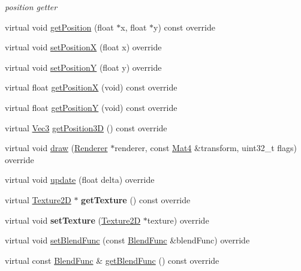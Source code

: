 \begin{DoxyCompactItemize}
\begin{DoxyCompactList}\small\item\em position getter \end{DoxyCompactList}\item 
virtual void \hyperlink{classMotionStreak_a376d2fd83190f87fa86f1aa91ac8f158}{get\+Position} (float $\ast$x, float $\ast$y) const override
\item 
virtual void \hyperlink{classMotionStreak_af6cb7fe8388e16af000893b75c9676a0}{set\+PositionX} (float x) override
\item 
virtual void \hyperlink{classMotionStreak_a75b545604e6a5f2351f6d4b034edb185}{set\+PositionY} (float y) override
\item 
virtual float \hyperlink{classMotionStreak_a21adf0bcf7c0713e1e0b0b00c5256a37}{get\+PositionX} (void) const override
\item 
virtual float \hyperlink{classMotionStreak_a05d60b5b380417f870046d8aa5f6626b}{get\+PositionY} (void) const override
\item 
virtual \hyperlink{classVec3}{Vec3} \hyperlink{classMotionStreak_ab07adb87a9770b5bbafa2fff999515f6}{get\+Position3D} () const override
\item 
virtual void \hyperlink{classMotionStreak_a5cde4c7320bde796324d67ac11125a1f}{draw} (\hyperlink{classRenderer}{Renderer} $\ast$renderer, const \hyperlink{classMat4}{Mat4} \&transform, uint32\+\_\+t flags) override
\item 
virtual void \hyperlink{classMotionStreak_a03d1e1113084f8e91b537539e7c19b9c}{update} (float delta) override
\item 
\mbox{\label{classMotionStreak_a0efaeb00232506d2181cc57409b14fb7}} 
virtual \hyperlink{classTexture2D}{Texture2D} $\ast$ {\bfseries get\+Texture} () const override
\item 
\mbox{\label{classMotionStreak_af8bb96c68d2d0ce89f9d7d711d6852a7}} 
virtual void {\bfseries set\+Texture} (\hyperlink{classTexture2D}{Texture2D} $\ast$texture) override
\item 
virtual void \hyperlink{classMotionStreak_adccc64d7aba6a8ffc6ce34a0813630af}{set\+Blend\+Func} (const \hyperlink{structBlendFunc}{Blend\+Func} \&blend\+Func) override
\item 
virtual const \hyperlink{structBlendFunc}{Blend\+Func} \& \hyperlink{classMotionStreak_a3a0c0b09fffc1d33efaf197f22e6e590}{get\+Blend\+Func} () const override
\item 

\end{DoxyCompactItemize}
